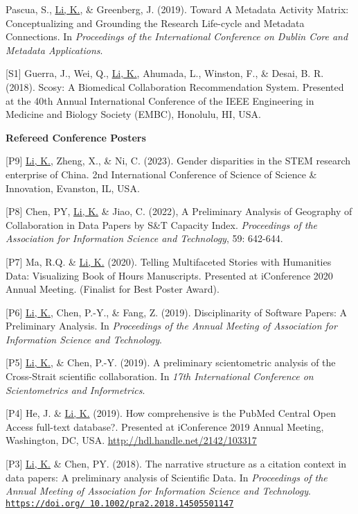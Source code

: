 \documentclass[margin, 10pt]{res} %
\begin{document}
\begin{resume}
[S2] Pascua, S., \underline{Li, K.}, \& Greenberg, J. (2019). Toward A Metadata Activity Matrix: Conceptualizing and Grounding the Research Life-cycle and Metadata Connections. In \textit{Proceedings of the International Conference on Dublin Core and Metadata Applications}.

[S1] Guerra, J., Wei, Q., \underline{Li, K.}, Ahumada, L., Winston, F., \& Desai, B. R. (2018). Scosy: A Biomedical Collaboration Recommendation System. Presented at the 40th Annual International Conference of the IEEE Engineering in Medicine and Biology Society (EMBC), Honolulu, HI, USA.

\textbf{Refereed Conference Posters}

[P9] \underline{Li, K.}, Zheng, X., \& Ni, C. (2023). Gender disparities in the STEM research enterprise of China. 2nd International Conference of Science of Science \& Innovation, Evanston, IL, USA.

[P8] Chen, PY, \underline{Li, K.} \& Jiao, C. (2022), A Preliminary Analysis of Geography of Collaboration in Data Papers by S\&T Capacity Index. \textit{Proceedings of the Association for Information Science and Technology}, 59: 642-644.

[P7] Ma, R.Q. \& \underline{Li, K.} (2020). Telling Multifaceted Stories with Humanities Data: Visualizing Book of Hours Manuscripts. Presented at iConference 2020 Annual Meeting. (Finalist for Best Poster Award).

[P6] \underline{Li, K.}, Chen, P.-Y., \& Fang, Z. (2019). Disciplinarity of Software Papers: A Preliminary Analysis. In \textit{Proceedings of the Annual Meeting of Association for Information Science and Technology}.

[P5] \underline{Li, K.}, \& Chen, P.-Y. (2019). A preliminary scientometric analysis of the Cross-Strait scientific collaboration. In \textit{17th International Conference on Scientometrics and Informetrics}.

[P4] He, J. \& \underline{Li, K.} (2019). How comprehensive is the PubMed Central Open Access full-text database?. Presented at iConference 2019 Annual Meeting, Washington, DC, USA. \href{http://hdl.handle.net/2142/103317}{http://hdl.handle.net/2142/103317}

[P3] \underline{Li, K.} \& Chen, PY. (2018). The narrative structure as a citation context in data papers: A preliminary analysis of Scientific Data. In \textit{Proceedings of the Annual Meeting of Association for Information Science and Technology}. \href{https://doi.org/10.1002/pra2.2018.14505501147}{\nolinkurl{https://doi.org/ 10.1002/pra2.2018.14505501147}}


\end{resume}
\end{document}
